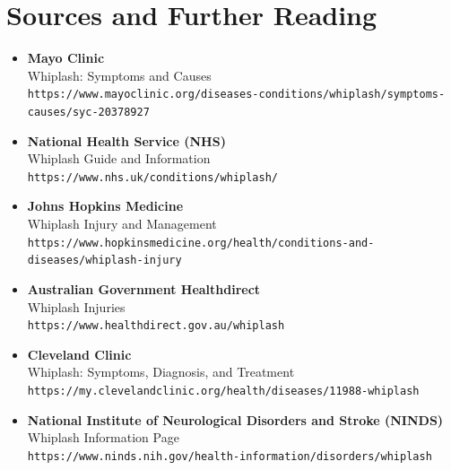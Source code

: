 \section*{Sources and Further Reading}
\begin{itemize}
    \item \textbf{Mayo Clinic} \\
    Whiplash: Symptoms and Causes \\
    \texttt{https://www.mayoclinic.org/diseases-conditions/whiplash/symptoms-causes/syc-20378927}

    \item \textbf{National Health Service (NHS)} \\
    Whiplash Guide and Information \\
    \texttt{https://www.nhs.uk/conditions/whiplash/}

    \item \textbf{Johns Hopkins Medicine} \\
    Whiplash Injury and Management \\
    \texttt{https://www.hopkinsmedicine.org/health/conditions-and-diseases/whiplash-injury}

    \item \textbf{Australian Government Healthdirect} \\
    Whiplash Injuries \\
    \texttt{https://www.healthdirect.gov.au/whiplash}

    \item \textbf{Cleveland Clinic} \\
    Whiplash: Symptoms, Diagnosis, and Treatment \\
    \texttt{https://my.clevelandclinic.org/health/diseases/11988-whiplash}

    \item \textbf{National Institute of Neurological Disorders and Stroke (NINDS)} \\
    Whiplash Information Page \\
    \texttt{https://www.ninds.nih.gov/health-information/disorders/whiplash}
\end{itemize}